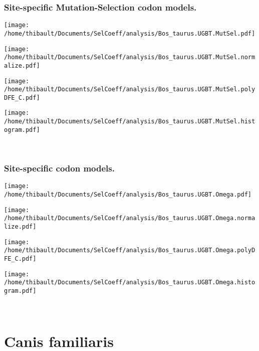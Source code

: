 \subsubsection*{Site-specific Mutation-Selection codon models.} 
\begin{minipage}{0.49\linewidth} 
\texttt{[image: /home/thibault/Documents/SelCoeff/analysis/Bos\_taurus.UGBT.MutSel.pdf]} 
\end{minipage}
\begin{minipage}{0.49\linewidth} 
\texttt{[image: /home/thibault/Documents/SelCoeff/analysis/Bos\_taurus.UGBT.MutSel.normalize.pdf]} 
\end{minipage}
\begin{minipage}{0.49\linewidth} 
\texttt{[image: /home/thibault/Documents/SelCoeff/analysis/Bos\_taurus.UGBT.MutSel.polyDFE\_C.pdf]} 
\end{minipage}
\begin{minipage}{0.49\linewidth} 
\texttt{[image: /home/thibault/Documents/SelCoeff/analysis/Bos\_taurus.UGBT.MutSel.histogram.pdf]} 
\end{minipage}
\\ 
\subsubsection*{Site-specific codon models.} 
\begin{minipage}{0.49\linewidth} 
\texttt{[image: /home/thibault/Documents/SelCoeff/analysis/Bos\_taurus.UGBT.Omega.pdf]} 
\end{minipage}
\begin{minipage}{0.49\linewidth} 
\texttt{[image: /home/thibault/Documents/SelCoeff/analysis/Bos\_taurus.UGBT.Omega.normalize.pdf]} 
\end{minipage}
\begin{minipage}{0.49\linewidth} 
\texttt{[image: /home/thibault/Documents/SelCoeff/analysis/Bos\_taurus.UGBT.Omega.polyDFE\_C.pdf]} 
\end{minipage}
\begin{minipage}{0.49\linewidth} 
\texttt{[image: /home/thibault/Documents/SelCoeff/analysis/Bos\_taurus.UGBT.Omega.histogram.pdf]} 
\end{minipage}
\\ 
\section{Canis familiaris} 
 
